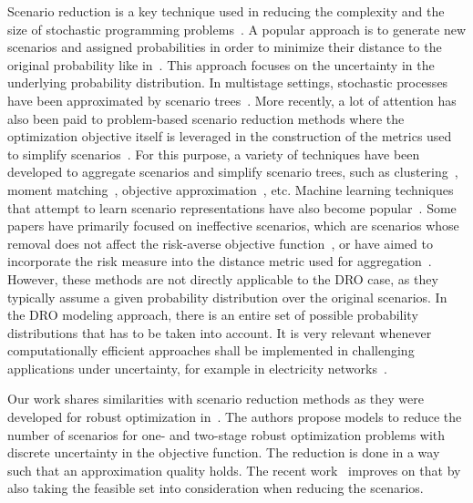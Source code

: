 \documentclass{article}
\begin{document}
Scenario reduction is a key technique used in reducing the complexity and the size of stochastic programming problems~\cite{roemisch-scenredSO}.
A popular approach is to generate new scenarios and assigned probabilities in order to minimize their distance to the original probability like in~\cite{dupavcova2003scenario, henrion2009scenario}.
This approach focuses on the uncertainty in the underlying probability distribution.
In multistage settings, stochastic processes have been approximated by scenario trees~\cite{hochreiter2007financial, pflug2001scenario}.
More recently, a lot of attention has also been paid to problem-based scenario reduction methods where the optimization objective itself is leveraged in the construction of the metrics used to simplify scenarios~\cite{bertsimas2023optimization,keutchayan2023problem, problem_driven_scen_reduction, zhang2023optimized}. 
For this purpose, a variety of techniques have been developed to aggregate scenarios and simplify scenario trees, such as clustering~\cite{kammammettu2023scenario}, moment matching~\cite{carino1998concepts}, objective approximation~\cite{zenios1993constructing}, etc.
Machine learning techniques that attempt to learn scenario representations have also become popular~\cite{wu2022learning}.
Some papers have primarily focused on ineffective scenarios, which are scenarios whose removal does not affect the risk-averse objective function~\cite{arpon2018scenario}, or have aimed to incorporate the risk measure into the distance metric used for aggregation~\cite{pineda2010scenario}.
However, these methods are not directly applicable to the DRO case, as they typically assume a given probability distribution over the original scenarios.
In the DRO modeling approach, there is an entire set of possible
probability distributions that has to be taken into account.
It is very relevant whenever computationally efficient approaches
shall be implemented in challenging applications under uncertainty,
for example in electricity networks~\cite{aigner_curtailment, aigner_dvine}.

Our work shares similarities with scenario reduction methods as they were developed for
robust optimization in~\cite{goerigk2019representative, goerigk_scen_reduction}.
The authors propose models to reduce the number of scenarios for one- and two-stage robust optimization problems with discrete uncertainty in the objective function.
The reduction is done in a way such that an approximation quality holds.
The recent work~\cite{goerigk_new} improves on that by also taking the feasible set into consideration when reducing the scenarios.
\end{document}
